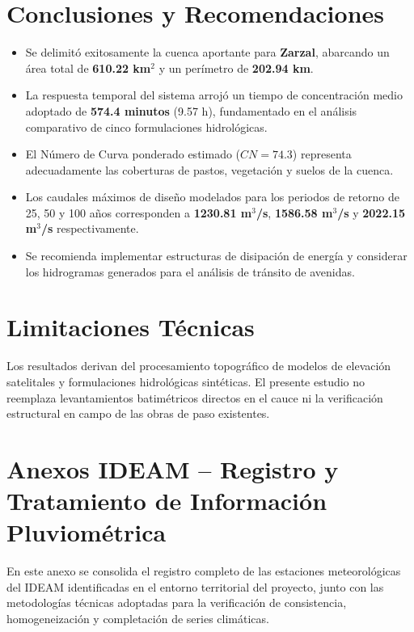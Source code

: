 \documentclass[11pt,a4paper]{article}
\begin{document}
\section{Conclusiones y Recomendaciones}
\begin{itemize}
\item Se delimitó exitosamente la cuenca aportante para \textbf{Zarzal}, abarcando un área total de \textbf{610.22 km$^2$} y un perímetro de \textbf{202.94 km}.
\item La respuesta temporal del sistema arrojó un tiempo de concentración medio adoptado de \textbf{574.4 minutos} (9.57 h), fundamentado en el análisis comparativo de cinco formulaciones hidrológicas.
\item El Número de Curva ponderado estimado ($CN = 74.3$) representa adecuadamente las coberturas de pastos, vegetación y suelos de la cuenca.
\item Los caudales máximos de diseño modelados para los periodos de retorno de 25, 50 y 100 años corresponden a \textbf{1230.81 m$^3$/s}, \textbf{1586.58 m$^3$/s} y \textbf{2022.15 m$^3$/s} respectivamente.
\item Se recomienda implementar estructuras de disipación de energía y considerar los hidrogramas generados para el análisis de tránsito de avenidas.
\end{itemize}

\section{Limitaciones Técnicas}
Los resultados derivan del procesamiento topográfico de modelos de elevación satelitales y formulaciones hidrológicas sintéticas. El presente estudio no reemplaza levantamientos batimétricos directos en el cauce ni la verificación estructural en campo de las obras de paso existentes.

\newpage
\section{Anexos IDEAM -- Registro y Tratamiento de Información Pluviométrica}
En este anexo se consolida el registro completo de las estaciones meteorológicas del IDEAM identificadas en el entorno territorial del proyecto, junto con las metodologías técnicas adoptadas para la verificación de consistencia, homogeneización y completación de series climáticas.
\end{document}
